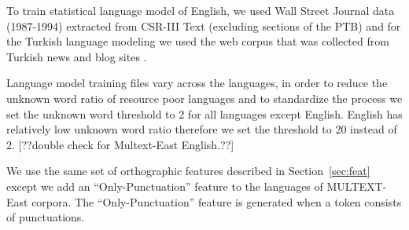 To train statistical language model of English, we used Wall Street
Journal data (1987-1994) extracted from CSR-III Text \cite{csr3text}
(excluding sections of the PTB) and for the Turkish language modeling
we used the web corpus that was collected from Turkish news and blog
sites \cite{sak2008turkish}.

Language model training files vary across the languages, in order to
reduce the unknown word ratio of resource poor languages and to
standardize the process we set the unknown word threshold to 2 for all
languages except English.  English has relatively low unknown word
ratio therefore we set the threshold to 20 instead of 2. [??double
  check for Multext-East English.??]

We use the same set of orthographic features described in
Section~\ref{sec:feat} except we add an ``Only-Punctuation'' feature
to the languages of MULTEXT-East corpora.  The ``Only-Punctuation''
feature is generated when a token consists of punctuations.


